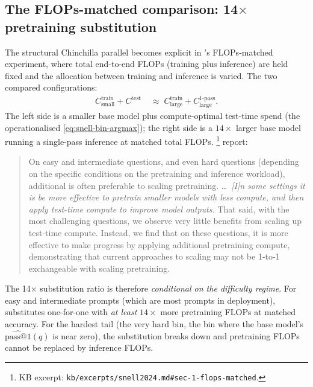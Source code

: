 \subsection{The FLOPs-matched comparison: 14$\times$ pretraining substitution}
\label{sec:snell-flops-matched}

The structural Chinchilla parallel becomes explicit in
\citet[\S 6]{snell2024}'s FLOPs-matched experiment, where total
end-to-end FLOPs (training plus inference) are held fixed and the
allocation between training and inference is varied. The two compared
configurations:
\begin{align}
  C_\text{small}^\text{train} + C^\text{test}
    &\;\approx\; C_\text{large}^\text{train} + C_\text{large}^\text{1-pass}.
  \label{eq:flops-matched}
\end{align}
The left side is a smaller base model plus compute-optimal test-time
spend (the operationalised \cref{eq:snell-bin-argmax}); the right side
is a $14\times$ larger base model running a single-pass inference at
matched total FLOPs. \citet[\S 1]{snell2024}%
\footnote{KB excerpt: \nolinkurl{kb/excerpts/snell2024.md#sec-1-flops-matched}.}
report:
\begin{quote}
On easy and intermediate questions, and even hard questions
(depending on the specific conditions on the pretraining and inference
workload), additional  is often preferable to scaling
pretraining. \ldots\ \emph{[I]n some settings it is be more effective to
pretrain smaller models with less compute, and then apply test-time
compute to improve model outputs.} That said, with the most challenging
questions, we observe very little benefits from scaling up test-time
compute. Instead, we find that on these questions, it is more effective
to make progress by applying additional pretraining compute,
demonstrating that current approaches to scaling  may
not be 1-to-1 exchangeable with scaling pretraining.
\end{quote}

The 14$\times$ substitution ratio is therefore \emph{conditional on the
difficulty regime}. For easy and intermediate prompts (which are most
prompts in deployment),  substitutes one-for-one with
\emph{at least} $14\times$ more pretraining FLOPs at matched accuracy.
For the hardest tail (the very hard bin, the bin where the base model's
$\widehat{\mathrm{pass@}1}(q)$ is near zero), the substitution breaks
down and pretraining FLOPs cannot be replaced by inference FLOPs.

